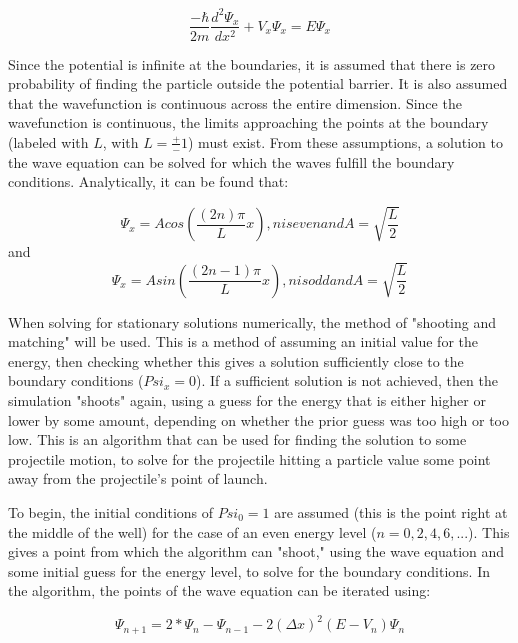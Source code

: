 \documentclass[12pt]{article}                  %
\begin{document}
\begin{equation}
\frac{-\hbar}{2m}\frac{d^2\Psi_{x}}{dx^2}+V_{x}\Psi_{x} = E\Psi_{x}
\label{1D TISE}
\end{equation}

Since the potential is infinite at the boundaries, it is assumed that there is zero probability of finding the particle outside the potential barrier. It is also assumed that the wavefunction is continuous across the entire dimension. Since the wavefunction is continuous, the limits approaching the points at the boundary (labeled with $L$, with $L = \frac{+}{-}1$) must exist. From these assumptions, a solution to the wave equation can be solved for which the waves fulfill the boundary conditions. Analytically, it can be found that: 


\pagebreak

\begin{equation}
\Psi_{x} = Acos(\frac{(2n)\pi}{L}x), n is even and A = \sqrt{\frac{L}{2}}
\label{Wavefunction Solution, even}
\end{equation}
and
\begin{equation}
\Psi_{x} = Asin(\frac{(2n-1)\pi}{L}x), n is odd and A = \sqrt{\frac{L}{2}}
\label{Wavefunction Solution, odd}
\end{equation}

When solving for stationary solutions numerically, the method of "shooting and matching" will be used. This is a method of assuming an initial value for the energy, then checking whether this gives a solution sufficiently close to the boundary conditions ($Psi_{x} = 0$). If a sufficient solution is not achieved, then the simulation "shoots" again, using a guess for the energy that is either higher or lower by some amount, depending on whether the prior guess was too high or too low. This is an algorithm that can be used for finding the solution to some projectile motion, to solve for the projectile hitting a particle value some point away from the projectile's point of launch. 

To begin, the initial conditions of $Psi_{0} = 1$ are assumed (this is the point right at the middle of the well) for the case of an even energy level ($n = 0, 2, 4, 6, ...$). This gives a point from which the algorithm can "shoot," using the wave equation and some initial guess for the energy level, to solve for the boundary conditions. In the algorithm, the points of the wave equation can be iterated using: 

\begin{equation}
\Psi_{n+1}= 2*\Psi_{n} - \Psi_{n-1} - 2(\Delta x)^2(E - V_{n})\Psi_{n}
\end{equation} 
\end{document}
